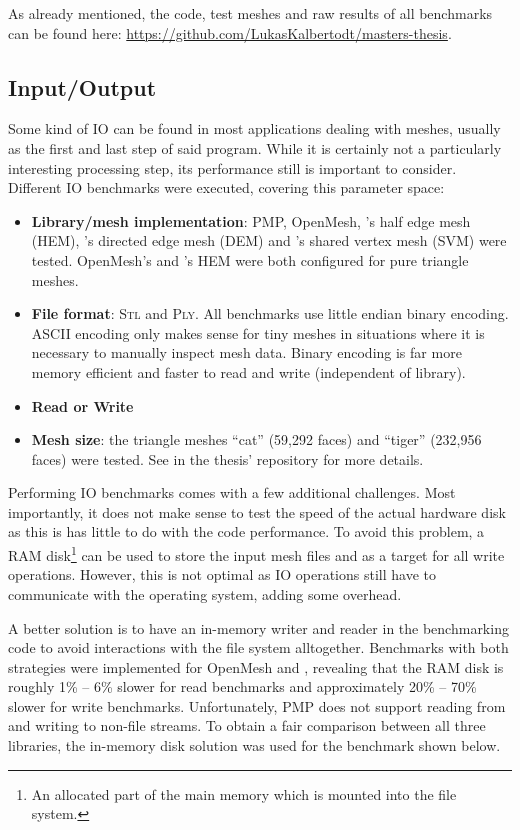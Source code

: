 As already mentioned, the code, test meshes and raw results of all benchmarks can be found here: \url{https://github.com/LukasKalbertodt/masters-thesis}.


\newpage
\subsection{Input/Output}

Some kind of IO can be found in most applications dealing with meshes, usually as the first and last step of said program.
While it is certainly not a particularly interesting processing step, its performance still is important to consider.
Different IO benchmarks were executed, covering this parameter space:

\begin{itemize}
  \item \textbf{Library/mesh implementation}: PMP, OpenMesh, 's half edge mesh (HEM), 's directed edge mesh (DEM) and 's shared vertex mesh (SVM) were tested.
  OpenMesh's and 's HEM were both configured for pure triangle meshes.
  \item \textbf{File format}: \textsc{Stl} and \textsc{Ply}.
  All benchmarks use little endian binary encoding.
  ASCII encoding only makes sense for tiny meshes in situations where it is necessary to manually inspect mesh data.
  Binary encoding is far more memory efficient and faster to read and write (independent of library).
  \item \textbf{Read or Write}
  \item \textbf{Mesh size}: the triangle meshes \enquote{cat} (59,292 faces) and \enquote{tiger} (232,956 faces) were tested.
  See  in the thesis' repository for more details.
\end{itemize}

Performing IO benchmarks comes with a few additional challenges.
Most importantly, it does not make sense to test the speed of the actual hardware disk as this is has little to do with the code performance.
To avoid this problem, a RAM disk\footnote{An allocated part of the main memory which is mounted into the file system.} can be used to store the input mesh files and as a target for all write operations.
However, this is not optimal as IO operations still have to communicate with the operating system, adding some overhead.

A better solution is to have an in-memory writer and reader in the benchmarking code to avoid interactions with the file system alltogether.
Benchmarks with both strategies were implemented for OpenMesh and , revealing that the RAM disk is roughly 1\% -- 6\% slower for read benchmarks and approximately 20\% -- 70\% slower for write benchmarks.
Unfortunately, PMP does not support reading from and writing to non-file streams.
To obtain a fair comparison between all three libraries, the in-memory disk solution was used for the benchmark shown below.
